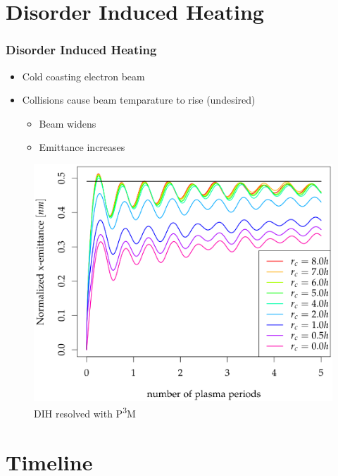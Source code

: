\documentclass[10pt]{beamer}
\begin{document}
\section{Disorder Induced Heating}

\begin{frame}
\frametitle{Disorder Induced Heating}

\begin{itemize}
	 \setlength{\itemsep}{3mm}
	\item Cold coasting electron beam
	\item Collisions cause beam temparature to rise (undesired)
	\begin{itemize}
		\setlength{\itemsep}{2mm}
		\item Beam widens
		\item Emittance increases
	\end{itemize}
\end{itemize}

\begin{figure}
	\includegraphics[scale=0.17]{figures/dih_ulmer.png}
	\caption{DIH resolved with P\textsuperscript{3}M \cite{p3m_ulmer}}
	\label{fig:DIH_p3m}
\end{figure}

\end{frame}

\section{Timeline}
\end{document}
